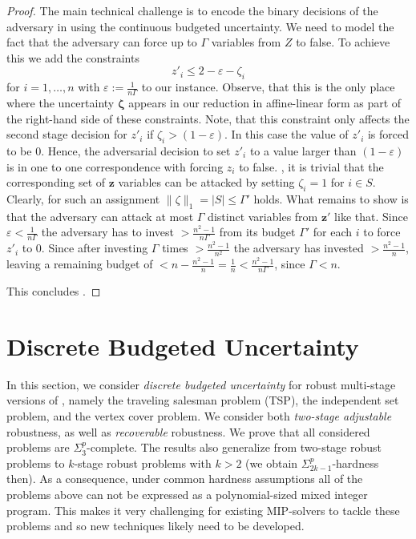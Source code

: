 \documentclass[a4paper,abstracton]{scrartcl}
\begin{document}
\begin{proof}
    The main technical challenge is to encode the binary decisions of the adversary 
    in {\radj} using the continuous budgeted uncertainty.
    We need to model the fact that the adversary can force up to $\Gamma$ variables from $Z$ to false.
    To achieve this we add the constraints
    \[ z'_i \leq 2 - \varepsilon - \zeta_i \]
    for $i=1,\dots,n$ with $\varepsilon := \frac{1}{n \Gamma}$ to our instance.
    Observe, that this is the only place where the uncertainty $\pmb{\zeta}$ appears in our 
    reduction  in affine-linear form as part of the right-hand side of these constraints.
    Note, that this constraint only affects the second stage decision for $z'_i$ if 
    $\zeta_i > (1-\varepsilon)$. In this case the value of $z'_i$ is forced to be $0$. Hence, the adversarial decision to set $z'_i$ to a value larger 
    than $(1-\varepsilon)$ is in one to one correspondence with forcing $z_i$ to false.
    ,
    it is trivial that the corresponding set of $\pmb{z}$ variables can be attacked by 
    setting $\zeta_i = 1$ for $i \in S$. Clearly, for such an assignment  $\| \zeta \|_1 = |S| \leq \Gamma'$ holds.
    What remains to show is that the adversary can attack at most $\Gamma$ distinct 
    variables from $\pmb{z}'$ like that.
    Since $\varepsilon < \frac{1}{n \Gamma}$ the adversary has to invest $ > \frac{n^2-1}{n \Gamma}$ from its budget $\Gamma'$ for each $i$ to
    force $z'_i$ to $0$.
    Since after investing $\Gamma$ times $ > \frac{n^2-1}{n^2}$ the adversary has invested $> \frac{n^2-1}{n}$,
    leaving a remaining budget of $< n - \frac{n^2-1}{n} = \frac{1}{n} < \frac{n^2-1}{n \Gamma}$, since $\Gamma < n$.

    This concludes .
\end{proof}


\section{Discrete Budgeted Uncertainty}
\label{sec:discbudgeted}

In this section, we consider \emph{discrete budgeted uncertainty} for robust multi-stage versions of , namely the traveling salesman problem (TSP), the independent set problem, and the vertex cover problem. We consider both \emph{two-stage adjustable} robustness, as well as \emph{recoverable} robustness. We prove that all considered problems are $\Sigma_3^p$-complete. The results also generalize from two-stage robust problems to $k$-stage robust problems with $k > 2$ (we obtain $\Sigma^p_{2k-1}$-hardness then). As a consequence, under common hardness assumptions all of the problems above can not be expressed as a polynomial-sized mixed integer program. This makes it very challenging for existing MIP-solvers to tackle these problems and so new techniques likely need to be developed.
\end{document}
